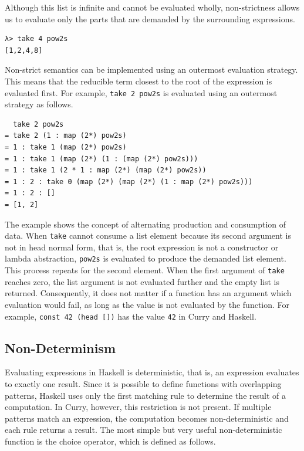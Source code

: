 \documentclass[a4paper, 11pt, fleqn, twoside]{scrreprt}
\newcommand{\hinl}[1]{\texttt{#1}}
\begin{document}
Although this list is infinite and cannot be evaluated wholly, non-strictness allows us to evaluate only the parts that are demanded by the surrounding expressions.

\begin{verbatim}
λ> take 4 pow2s
[1,2,4,8]
\end{verbatim}

Non-strict semantics can be implemented using an outermost evaluation strategy.
This means that the reducible term closest to the root of the expression is evaluated first.
For example, \hinl{take 2 pow2s} is evaluated using an outermost strategy as follows.

\begin{verbatim}
  take 2 pow2s
= take 2 (1 : map (2*) pow2s)
= 1 : take 1 (map (2*) pow2s)
= 1 : take 1 (map (2*) (1 : (map (2*) pow2s)))
= 1 : take 1 (2 * 1 : map (2*) (map (2*) pow2s))
= 1 : 2 : take 0 (map (2*) (map (2*) (1 : map (2*) pow2s)))
= 1 : 2 : []
= [1, 2]
\end{verbatim}

The example shows the concept of alternating production and consumption of data.
When \hinl{take} cannot consume a list element because its second argument is not in head normal form, that is, the root expression is not a constructor or lambda abstraction, \hinl{pow2s} is evaluated to produce the demanded list element.
This process repeats for the second element.
When the first argument of \hinl{take} reaches zero, the list argument is not evaluated further and the empty list is returned.
Consequently, it does not matter if a function has an argument which evaluation would fail, as long as the value is not evaluated by the function.
For example, \hinl{const 42 (head [])} has the value \hinl{42} in Curry and Haskell.

\subsection{Non-Determinism}
Evaluating expressions in Haskell is deterministic, that is, an expression evaluates to exactly one result.
Since it is possible to define functions with overlapping patterns, Haskell uses only the first matching rule to determine the result of a computation.
In Curry, however, this restriction is not present.
If multiple patterns match an expression, the computation becomes non-deterministic and each rule returns a result.
The most simple but very useful non-deterministic function is the choice operator, which is defined as follows.
\end{document}
